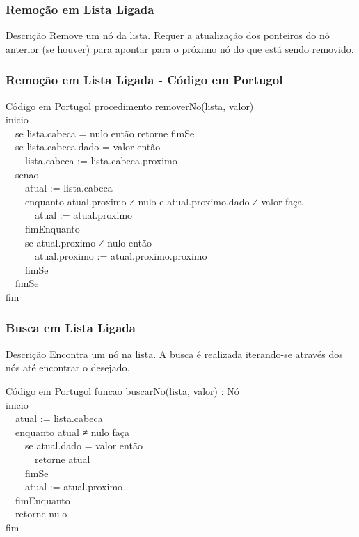 \begin{frame}[fragile]
  \frametitle{Remoção em Lista Ligada}
  \begin{block}{Descrição}
    Remove um nó da lista. Requer a atualização dos ponteiros do nó anterior (se houver) para apontar para o próximo nó do que está sendo removido.
  \end{block}
  
\end{frame}
\begin{frame}[fragile]
  \frametitle{Remoção em Lista Ligada - Código em Portugol}
  \small
  \begin{block}{Código em Portugol}
    procedimento removerNo(lista, valor) \\
    inicio \\
    \ \ se lista.cabeca = nulo então retorne fimSe \\
    \ \ se lista.cabeca.dado = valor então \\
    \ \ \ \ lista.cabeca := lista.cabeca.proximo \\
    \ \ senao \\
    \ \ \ \ atual := lista.cabeca \\
    \ \ \ \ enquanto atual.proximo ≠ nulo e atual.proximo.dado ≠ valor faça \\
    \ \ \ \ \ \ atual := atual.proximo \\
    \ \ \ \ fimEnquanto \\
    \ \ \ \ se atual.proximo ≠ nulo então \\
    \ \ \ \ \ \ atual.proximo := atual.proximo.proximo \\
    \ \ \ \ fimSe \\
    \ \ fimSe \\
    fim
  \end{block}
\end{frame}

\begin{frame}[fragile]
  \frametitle{Busca em Lista Ligada}
  \begin{block}{Descrição}
    Encontra um nó na lista. A busca é realizada iterando-se através dos nós até encontrar o desejado.
  \end{block}
  \small
  \begin{block}{Código em Portugol}
    funcao buscarNo(lista, valor) : Nó \\
    inicio \\
    \ \ atual := lista.cabeca \\
    \ \ enquanto atual ≠ nulo faça \\
    \ \ \ \ se atual.dado = valor então \\
    \ \ \ \ \ \ retorne atual \\
    \ \ \ \ fimSe \\
    \ \ \ \ atual := atual.proximo \\
    \ \ fimEnquanto \\
    \ \ retorne nulo \\
    fim
  \end{block}
\end{frame}

